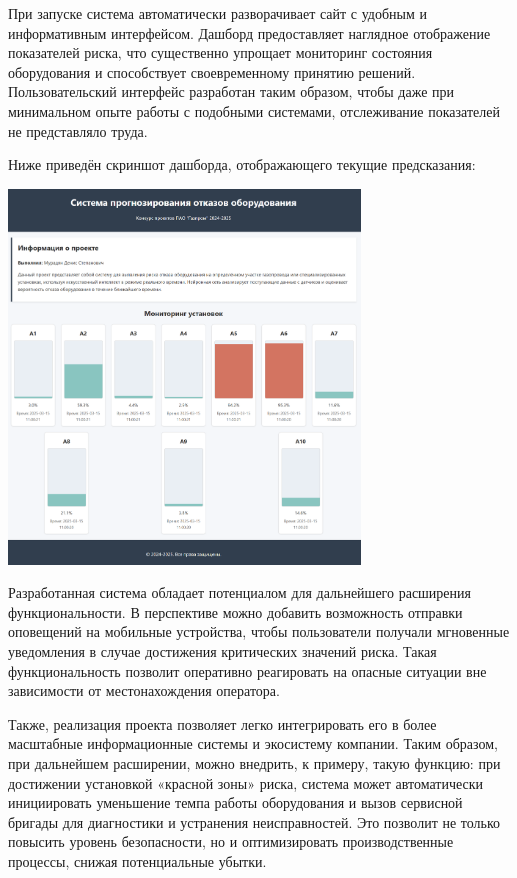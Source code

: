 \documentclass[a4paper,12pt]{article}
\begin{document}
\begin{flushleft}
При запуске система автоматически разворачивает сайт с удобным и информативным интерфейсом.
Дашборд предоставляет наглядное отображение показателей риска, что существенно упрощает мониторинг
состояния оборудования и способствует своевременному принятию решений. Пользовательский интерфейс разработан таким
образом, чтобы даже при минимальном опыте работы с подобными системами, отслеживание показателей не представляло труда.

Ниже приведён скриншот дашборда, отображающего текущие предсказания:
\begin{center}
    \includegraphics[width=0.7\textwidth]{../Include/dashboard.png}
\end{center}

Разработанная система обладает потенциалом для дальнейшего расширения функциональности.
В перспективе можно добавить возможность отправки оповещений на мобильные устройства,
чтобы пользователи получали мгновенные уведомления в случае достижения критических значений риска.
Такая функциональность позволит оперативно реагировать на опасные ситуации вне зависимости от местонахождения оператора.

Также, реализация проекта позволяет легко интегрировать его в более масштабные информационные системы и экосистему компании.
Таким образом, при дальнейшем расширении, можно внедрить, к примеру, такую функцию: при достижении установкой
«красной зоны» риска, система может автоматически инициировать уменьшение темпа работы оборудования и вызов сервисной бригады
для диагностики и устранения неисправностей.
Это позволит не только повысить уровень безопасности, но и оптимизировать производственные процессы, снижая потенциальные убытки.


\end{flushleft}
\end{document}
